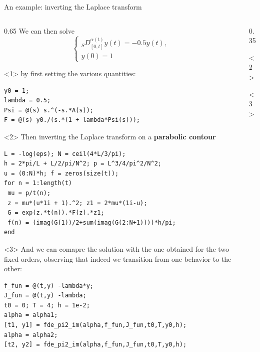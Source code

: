 \documentclass[aspectratio=169,xcolor=dvipsnames]{beamer}
\begin{document}
\begin{frame}[fragile]{An example: inverting the Laplace transform}

\begin{columns}
\begin{column}{0.65\columnwidth}
We can then solve 
\[
\begin{cases}
{}_{S}D^{\alpha(t)}_{[0,t]} y(t) = -0.5 y(t), \\
y(0) = 1
\end{cases}
\]
\begin{onlyenv}<1>
by first setting the various quantities:
\begin{verbatim}
y0 = 1;
lambda = 0.5;
Psi = @(s) s.^(-s.*A(s));
F = @(s) y0./(s.*(1 + lambda*Psi(s)));
\end{verbatim}
\end{onlyenv}
\begin{onlyenv}<2>
Then inverting the Laplace transform on a \textbf{parabolic contour}\vspace{-0.5em}
\begin{verbatim}
L = -log(eps); N = ceil(4*L/3/pi);
h = 2*pi/L + L/2/pi/N^2; p = L^3/4/pi^2/N^2;
u = (0:N)*h; f = zeros(size(t));
for n = 1:length(t)
 mu = p/t(n);
 z = mu*(u*1i + 1).^2; z1 = 2*mu*(1i-u);
 G = exp(z.*t(n)).*F(z).*z1;
 f(n) = (imag(G(1))/2+sum(imag(G(2:N+1))))*h/pi;
end
\end{verbatim}
\end{onlyenv}
\begin{onlyenv}<3>
And we can comapre the solution with the one obtained for the two fixed orders, observing
that indeed we transition from one behavior to the other:
\begin{verbatim}
f_fun = @(t,y) -lambda*y; 
J_fun = @(t,y) -lambda;
t0 = 0; T = 4; h = 1e-2;
alpha = alpha1;
[t1, y1] = fde_pi2_im(alpha,f_fun,J_fun,t0,T,y0,h);
alpha = alpha2;
[t2, y2] = fde_pi2_im(alpha,f_fun,J_fun,t0,T,y0,h);
\end{verbatim}
\end{onlyenv}
\end{column}
\begin{column}{0.35\columnwidth}
\begin{onlyenv}<2>
\centering


\end{onlyenv}
\begin{onlyenv}<3>
\centering


\end{onlyenv}
\end{column}
\end{columns}

\end{frame}
\end{document}
